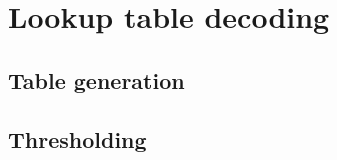 \section{Lookup table decoding}
\subsection{Table generation}\label{App: lookup_table}


\subsection{Thresholding}\label{App: steane_thresholding}


